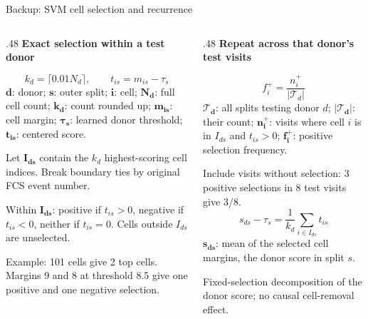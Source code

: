 \documentclass[aspectratio=169,10pt]{beamer}
\newcommand{\eyebrow}[1]{{\color{Teal}\bfseries #1}\par\smallskip}
\newcommand{\compactmath}{%
  \setlength{\abovedisplayskip}{4pt}\setlength{\belowdisplayskip}{4pt}%
  \setlength{\abovedisplayshortskip}{2pt}\setlength{\belowdisplayshortskip}{4pt}}
\begin{document}
\begin{frame}{Backup: SVM cell selection and recurrence}
  \small\compactmath
  \begin{columns}[T,onlytextwidth]
    \begin{column}{.48\textwidth}
      \eyebrow{Exact selection within a test donor}
      \[k_d=\lceil0.01N_d\rceil,\qquad t_{is}=m_{is}-\tau_s\]
      {\scriptsize $\boldsymbol{d}$: donor; $\boldsymbol{s}$: outer split; $\boldsymbol{i}$: cell; $\boldsymbol{N_d}$: full cell count; $\boldsymbol{k_d}$: count rounded up; $\boldsymbol{m_{is}}$: cell margin; $\boldsymbol{\tau_s}$: learned donor threshold; $\boldsymbol{t_{is}}$: centered score.}\par\medskip
      \small Let $\boldsymbol{I_{ds}}$ contain the $k_d$ highest-scoring cell indices. Break boundary ties by original FCS event number.\par\medskip
      Within $\boldsymbol{I_{ds}}$: positive if $t_{is}>0$, negative if $t_{is}<0$, neither if $t_{is}=0$. Cells outside $I_{ds}$ are unselected.\par\medskip
      {\scriptsize Example: 101 cells give 2 top cells. Margins 9 and 8 at threshold 8.5 give one positive and one negative selection.}
    \end{column}
    \begin{column}{.48\textwidth}
      \eyebrow{Repeat across that donor's test visits}
      \[f_i^+=\frac{n_i^+}{|\mathcal T_d|}\]
      {\scriptsize $\boldsymbol{\mathcal T_d}$: all splits testing donor $d$; $\boldsymbol{|\mathcal T_d|}$: their count; $\boldsymbol{n_i^+}$: visits where cell $i$ is in $I_{ds}$ and $t_{is}>0$; $\boldsymbol{f_i^+}$: positive selection frequency.}\par\smallskip
      \small\compactmath Include visits without selection: 3 positive selections in 8 test visits give 3/8.
      \[s_{ds}-\tau_s=\frac{1}{k_d}\sum_{i\in I_{ds}}t_{is}\]
      {\scriptsize $\boldsymbol{s_{ds}}$: mean of the selected cell margins, the donor score in split $s$.}\par\smallskip
      \small Fixed-selection decomposition of the donor score; no causal cell-removal effect.
    \end{column}
  \end{columns}
\end{frame}
\end{document}
